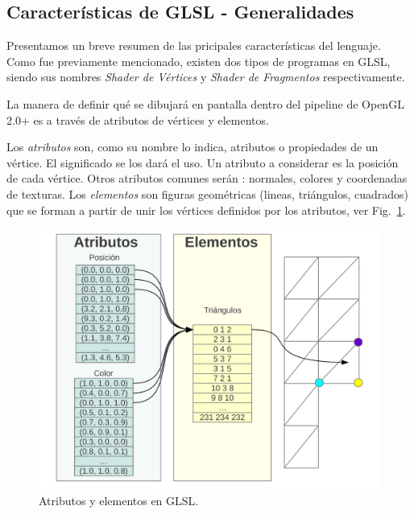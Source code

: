 

\subsection{Caracter\'isticas de GLSL - Generalidades}
Presentamos un breve resumen de las pricipales caracter\'isticas del lenguaje.
Como fue previamente mencionado, existen dos tipos de programas en GLSL, siendo sus nombres {\em Shader de Vértices} y {\em Shader de Fragmentos} respectivamente.

La manera de definir qué se dibujará en pantalla dentro del pipeline de OpenGL 2.0+  es a través de atributos de vértices y elementos. 


Los \emph{atributos} son, como su nombre lo indica, atributos o propiedades de un vértice. El significado se los dará el uso.
Un atributo a considerar es la posición de cada vértice.
Otros atributos comunes serán : normales, colores y coordenadas de texturas.
Los \emph{elementos} son figuras geométricas (lineas, triángulos, cuadrados) que se forman a partir de unir los vértices definidos por los atributos, ver Fig.~\ref{fg:atributos}.

\begin{figure}[h]
\begin{center}
\includegraphics[width=13cm]{figures/atributos}
\end{center}
\caption{Atributos y elementos en GLSL.}
\label{fg:atributos}
\end{figure}

